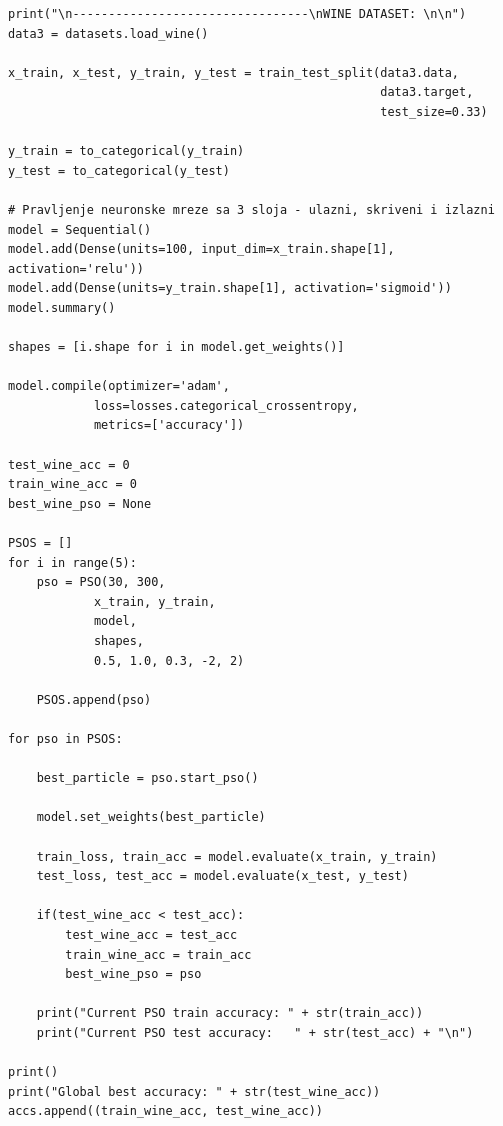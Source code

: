 \documentclass[a4paper]{article}
\begin{document}
\begin{lstlisting}
print("\n---------------------------------\nWINE DATASET: \n\n")
data3 = datasets.load_wine()

x_train, x_test, y_train, y_test = train_test_split(data3.data, 
                                                    data3.target, 
                                                    test_size=0.33)

y_train = to_categorical(y_train)
y_test = to_categorical(y_test)

# Pravljenje neuronske mreze sa 3 sloja - ulazni, skriveni i izlazni
model = Sequential()
model.add(Dense(units=100, input_dim=x_train.shape[1], activation='relu'))
model.add(Dense(units=y_train.shape[1], activation='sigmoid'))
model.summary()

shapes = [i.shape for i in model.get_weights()]

model.compile(optimizer='adam', 
            loss=losses.categorical_crossentropy, 
            metrics=['accuracy'])

test_wine_acc = 0
train_wine_acc = 0
best_wine_pso = None

PSOS = []
for i in range(5):
    pso = PSO(30, 300, 
            x_train, y_train, 
            model, 
            shapes, 
            0.5, 1.0, 0.3, -2, 2)

    PSOS.append(pso)

for pso in PSOS:

    best_particle = pso.start_pso()

    model.set_weights(best_particle)

    train_loss, train_acc = model.evaluate(x_train, y_train)
    test_loss, test_acc = model.evaluate(x_test, y_test)

    if(test_wine_acc < test_acc): 
        test_wine_acc = test_acc
        train_wine_acc = train_acc
        best_wine_pso = pso

    print("Current PSO train accuracy: " + str(train_acc))
    print("Current PSO test accuracy:   " + str(test_acc) + "\n")

print()
print("Global best accuracy: " + str(test_wine_acc))
accs.append((train_wine_acc, test_wine_acc))
\end{lstlisting}
\end{document}
